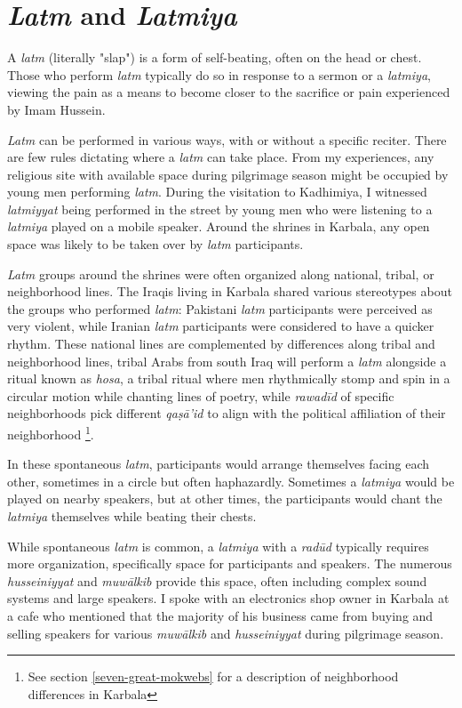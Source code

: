 \section{\emph{Latm} and \emph{Latmiya}} \label{latm-section}

A \emph{latm} (literally "slap") is a form of self-beating, often on the head or chest. Those who perform \emph{latm} typically do so in response to a sermon or a \emph{latmiya}, viewing the pain as a means to become closer to the sacrifice or pain experienced by Imam Hussein.

\emph{Latm} can be performed in various ways, with or without a specific reciter. There are few rules dictating where a \emph{latm} can take place. From my experiences, any religious site with available space during pilgrimage season might be occupied by young men performing \emph{latm}. During the visitation to Kadhimiya, I witnessed \emph{latmiyyat} being performed in the street by young men who were listening to a \emph{latmiya} played on a mobile speaker. Around the shrines in Karbala, any open space was likely to be taken over by \emph{latm} participants.

\emph{Latm} groups around the shrines were often organized along national, tribal, or neighborhood lines. The Iraqis living in Karbala shared various stereotypes about the groups who performed \emph{latm}: Pakistani \emph{latm} participants were perceived as very violent, while Iranian \emph{latm} participants were considered to have a quicker rhythm. These national lines are complemented by differences along tribal and neighborhood lines, tribal Arabs from south Iraq will perform a \emph{latm} alongside a ritual known as \emph{hosa}, a tribal ritual where men rhythmically stomp and spin in a circular motion while chanting lines of poetry, while \emph{rawadīd} of specific neighborhoods pick different \emph{qaṣā’id} to align with the political affiliation of their neighborhood \footnote{See section \ref{seven-great-mokwebs} for a description of neighborhood differences in Karbala}. 

In these spontaneous \emph{latm}, participants would arrange themselves facing each other, sometimes in a circle but often haphazardly. Sometimes a \emph{latmiya} would be played on nearby speakers, but at other times, the participants would chant the \emph{latmiya} themselves while beating their chests.

While spontaneous \emph{latm} is common, a \emph{latmiya} with a \emph{radūd} typically requires more organization, specifically space for participants and speakers. The numerous \emph{husseiniyyat} and \emph{muwālkib} provide this space, often including complex sound systems and large speakers. I spoke with an electronics shop owner in Karbala at a cafe who mentioned that the majority of his business came from buying and selling speakers for various \emph{muwālkib} and \emph{husseiniyyat} during pilgrimage season.

